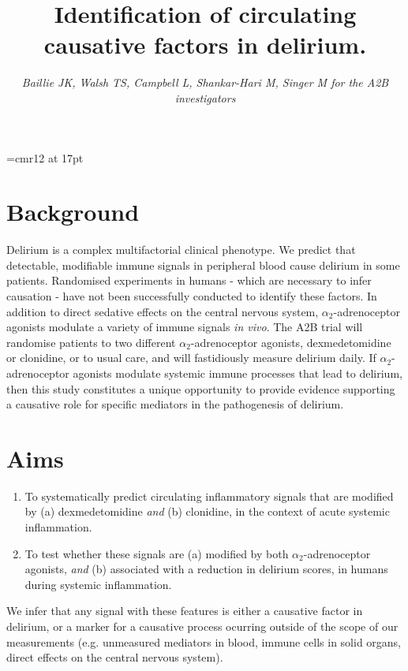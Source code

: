 \documentclass[a4paper,11pt,onecolumn]{IEEEtran}
\newcommand{\ataas}{$\alpha_2$-adrenoceptor agonists\xspace}
\begin{document}

\font\customfont=cmr12 at 17pt
\title{{\customfont Identification of circulating causative factors in delirium.}\vspace{-3ex}}
\author{
	\parbox{\linewidth}{\centering
			\emph{
			Baillie JK, Walsh TS, Campbell L, Shankar-Hari M, Singer M for the A2B investigators
			}
			\vspace{-7ex}
	}
}
\date{}
\maketitle

\section*{Background}
Delirium is a complex multifactorial clinical phenotype. We predict that detectable, modifiable immune signals in peripheral blood cause delirium in some patients\cite{teeling_systemic_2009}. Randomised experiments in humans - which are necessary to infer causation - have not been successfully conducted to identify these factors. In addition to direct sedative effects on the central nervous system, \ataas modulate a variety of immune signals \emph{in vivo}\cite{kim_effects_2014,qiao_sedation_2009}. The A2B trial will randomise patients to two different \ataas, dexmedetomidine or clonidine, or to usual care, and will fastidiously measure delirium daily. If \ataas modulate systemic immune processes that lead to delirium, then this study constitutes a unique opportunity to provide evidence supporting a causative role for specific mediators in the pathogenesis of delirium.\par

\section*{Aims}
\begin{enumerate}
	\item{To systematically predict circulating inflammatory signals that are modified by (a) dexmedetomidine \emph{and} (b) clonidine, in the context of acute systemic inflammation.}
	\item{To test whether these signals are (a) modified by both \ataas, \emph{and} (b) associated with a reduction in delirium scores, in humans during systemic inflammation.}
\end{enumerate}
We infer that any signal with these features is either a causative factor in delirium, or a marker for a causative process ocurring outside of the scope of our measurements (e.g. unmeasured mediators in blood, immune cells in solid organs, direct effects on the central nervous system).
\end{document}
